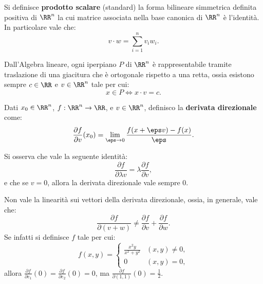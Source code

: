 \documentclass[12pt]{scrartcl}
\begin{document}

	\begin{definition}
		Si definisce \textbf{prodotto scalare} (standard)
		la forma bilineare simmetrica definita
		positiva di $\RR^n$ la cui matrice associata nella
		base canonica di $\RR^n$ è l'identità. In particolare
		vale che:
		\[ v \cdot w = \sum_{i=1}^n v_i w_i. \]
	\end{definition}
	
	\begin{remark}
		Dall'Algebra lineare, ogni iperpiano $P$ di $\RR^{n}$ è
		rappresentabile tramite traslazione di una giacitura che è ortogonale rispetto a una retta,
		ossia esistono sempre $c \in \RR$ e $v \in \RR^{n}$ tale per cui:
		\[ x \in P \iff x \cdot v = c. \]
	\end{remark}
	
	\begin{definition}
		Dati $x_0 \in \RR^n$, $f : \RR^n \to \RR$, e
		$v \in \RR^n$, definisco la \textbf{derivata direzionale}
		come:
		\[ \frac{\partial f}{\partial v}(x_0) = \lim_{\eps \to 0} \frac{f(x + \eps v) - f(x)}{\eps}. \]
	\end{definition}
	
	\begin{remark}
		Si osserva che vale la seguente identità:
		\[ \frac{\partial f}{\partial \lambda v} = \lambda \frac{\partial f}{\partial v}, \]
		e che se $v = 0$, allora la derivata direzionale vale
		sempre $0$.
	\end{remark}
	
	\begin{remark}
		Non vale la linearità sui vettori della derivata
		direzionale, ossia, in generale, vale che:
		\[ \frac{\partial f}{\partial (v + w)} \neq \frac{\partial f}{\partial v} + \frac{\partial f}{\partial w}. \]
		Se infatti si definisce $f$ tale per cui:
		\[ f(x, y) = \begin{cases}
			\frac{x^2 y}{x^2 + y^2} & (x, y) \neq 0,
			\\ 0 & (x, y) = 0,
		\end{cases} \]
		allora $\frac{\partial f}{\partial e_1}(0) =
		\frac{\partial f}{\partial e_2}(0) = 0$, ma
		$\frac{\partial f}{\partial (1,1)}(0) = \frac{1}{2}$.
	\end{remark}
	
\end{document}
